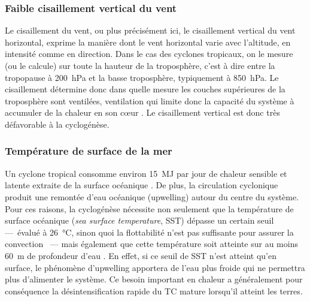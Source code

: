 \documentclass[../main.tex]{subfiles}
\begin{document}
\subsubsection{Faible cisaillement vertical du vent}

Le cisaillement du vent, ou plus précisément ici, le cisaillement vertical du vent horizontal, exprime la manière dont le vent horizontal varie avec l'altitude, en intensité comme en direction. Dans le cas des cyclones tropicaux, on le mesure (ou le calcule) sur toute la hauteur de la troposphère, c'est à dire entre la tropopause à \SI{200}{\hecto\pascal} et la basse troposphère, typiquement à \SI{850}{\hecto\pascal}. Le cisaillement détermine donc dans quelle mesure les couches supérieures de la troposphère sont ventilées, ventilation qui limite donc la capacité du système à accumuler de la chaleur en son cœur \parencite{gray_tropical_1975}. Le cisaillement vertical est donc très défavorable à la cyclogénèse.

\subsubsection{Température de surface de la mer}

Un cyclone tropical consomme environ \SI{15}{\mega\joule} par jour de chaleur sensible et latente extraite de la surface océanique \parencite{gray_tropical_1975}. De plus, la circulation cyclonique produit une remontée d'eau océanique (upwelling) autour du centre du système. Pour ces raisons, la cyclogénèse nécessite non seulement que la température de surface océanique (\textit{sea surface temperature}, SST) dépasse un certain seuil ---~évalué à \SI{26}{\degreeCelsius}, sinon quoi la
flottabilité n'est pas suffisante pour assurer la convection \parencite{palmen_formation_1948}~--- mais également que cette température soit atteinte sur au moins \SI{60}{\metre} de profondeur d'eau \parencite{leipper_observed_1967,perlboth_hurricane_1967}. En effet, si ce seuil de SST n'est atteint qu'en surface, le phénomène d'upwelling apportera de l'eau plus froide qui ne permettra plus d'alimenter le système. Ce besoin important en chaleur a généralement pour conséquence la désintensification rapide du TC mature lorsqu'il atteint les terres.
\end{document}
